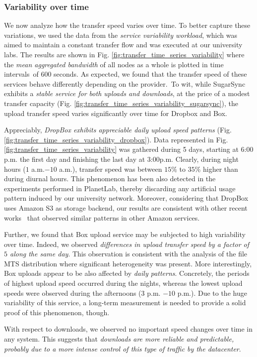 \subsubsection*{Variability over time}
We now analyze how the
transfer speed varies over time. To better capture these variations, 
we used the data from the \textit{service variability workload}, 
which was aimed to maintain a constant transfer flow and was executed at our university labs.
The results are shown in Fig. \ref{fig:transfer_time_series_variability} 
where the \textit{mean aggregated bandwidth} of all nodes as a whole is plotted in time 
intervals~of $600$ seconds. As expected, we found that the transfer speed of these services behave
differently depending on the provider.~To wit, while SugarSync
exhibits a \textit{stable service for both uploads and downloads}, at
the price of a modest transfer capacity (Fig. \ref{fig:transfer_time_series_variability_sugarsync}), the upload transfer
speed varies significantly over time for Dropbox and Box.

Appreciably, \textit{DropBox exhibits appreciable 
daily upload speed patterns} (Fig. \ref{fig:transfer_time_series_variability_dropbox}). 
Data represented in Fig. \ref{fig:transfer_time_series_variability} was gathered during 5 days,
starting at $6$:$00$p.m. the first day and finishing the last day at $3$:$00$p.m. Clearly, during 
night hours ($1$ a.m.$-10$ a.m.), transfer speed was between $15\%$ to
$35\%$ higher than during diurnal hours. This phenomenon has been also
detected in the experiments performed in PlanetLab, thereby discarding
any artificial usage pattern induced by our university network. Moreover, considering
that DropBox uses Amazon S3 as storage backend, our results are consistent with
other recent works~\cite{variability_ccgrid11} that observed 
similar patterns in other Amazon services.

Further, we found that Box upload service may be subjected to
high variability over time. Indeed, we observed \textit{differences in
upload transfer speed by a factor of $5$  along the same day}. This observation is consistent 
with the analysis of the file MTS distribution where significant
heterogeneity was present. More interestingly, Box uploads 
appear to be also affected by \textit{daily patterns}. Concretely, 
the periods of highest upload speed occurred during
the nights, whereas the lowest upload speeds were observed during the
afternoons ($3$ p.m. $-10$ p.m.). Due to the huge variability
of this service, a long-term measurement is needed to provide
a solid proof of this phenomenon, though.


With respect to downloads, we observed no important
speed changes over time in any system. This suggests that
\textit{downloads are more reliable and predictable, probably
due to a more intense control of this type of traffic by
the datacenter}.